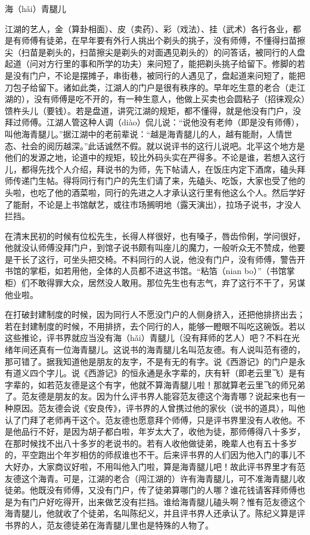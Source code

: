 \documentclass[12pt,UTF8]{ctexbook}
\begin{document}
海（hǎi）青腿儿


江湖的艺人，金（算卦相面）、皮（卖药）、彩（戏法）、挂（武术）各行各业，都是有师傅有徒弟，在早年要有外行人挑出个剃头的挑子，没有师傅，不懂得扫苗擦尖（扫苗是剃头的，扫苗擦尖是剃头的对面遇见剃头的）的问答话，被同行的人盘起道（问对方行里的事和所学的功夫）来问短了，能把剃头挑子给留下。修脚的若是没有门户，不论是摆摊子，串街巷，被同行的人遇见了，盘起道来问短了，能把刀包子给留下。诸如此类，江湖人的门户是很有秩序的。早年吃生意的老合（走江湖的），没有师傅是吃不开的，有一种生意人，他做上买卖也会圆粘子（招徕观众）馈杵头儿（要钱）。若是盘道，讲究江湖的规矩，都不懂得，就是他没有门户，没拜过师傅。江湖人管这种人调（diào）侃儿说：“说他没有老帅（即是没有师傅），叫他海青腿儿。”据江湖中的老前辈说：“越是海青腿儿的人，越有能耐，人情世态、社会的阅历越深。”此话诚然不假。就以说评书的这行儿说吧。北平这个地方是他们的发源之地，论道中的规矩，较比外码头实在严得多。不论是谁，若想入这行儿，都得先找个人介绍，拜说书的为师，先下帖请人，在饭庄内定下酒席，磕头拜师传递门生帖。得将同行有门户的先生们请了来，先磕头、吃饭，大家也受了他的头啦，也吃了他的酒菜啦，同行的先进之人才承认这行里有他这么个人。然后学好了能耐，不论是上书馆献艺，或往市场搁明地（露天演出），拉场子说书，才没人拦挡。

在清末民初的时候有位松先生，长得人样很好，也有嗓子，唇齿伶俐，学问很好，他就没认师傅没拜门户，到馆子说书颇有叫座儿的魔力，一般听众无不赞成，他要是干长了这行，可坐头把交椅。不料同行的人说，他没有门户，没有师傅，警告开书馆的掌柜，如若用他，全体的人员都不进这书馆。“粘箔（nian bo）”（书馆掌柜）们不敢得罪大众，居然没人敢用。那位先生也有志气，弃了这行不干了，另谋他业啦。

在打破封建制度的时候，因为同行人不愿没门户的人侧身挤入，还把他排挤出去；若在封建制度的时候，不用排挤，去个同行的人，能够一瞪眼不叫吃这碗饭。若以这些推论，评书界就应当没有海（hǎi）青腿儿（没有拜师的艺人）吧？不料在光绪年间还真有一位海青腿儿。这说书的海青腿儿名叫范友德。有人说叫范有德的，那可错了。据我知道他是朋友的友字，不是有无的有字。说《西游记》的门户是永有道义四个字儿。说《西游记》的恒永通是永字辈的，庆有轩（即老云里飞）是有字辈的，如若范友德是这个有字，他就不算海青腿儿啦！那就算老云里飞的师兄弟了。范友德是朋友的友。因为什么评书界人能容范友德这个海青哪？说起来也有一种原因。范友德会说《安良传》，评书界的人曾携过他的家伙（说书的道具），叫他认了门拜了老师再干这个。范友德也愿意拜个师傅，只是评书界里没有人收他。不是他品行不好，是因为胡子都白啦，年岁太大了，收他为徒，那师傅得八十多岁，在那时候找不出八十多岁的老说书的。若有人收他做徒弟，晚辈人也有五十多岁的，平空跑出个年岁相仿的师叔谁也不干。后来评书界的人们因为他入门的事儿不大好办，大家商议好啦，不用叫他入门啦，算是海青腿儿吧！故此评书界里才有范友德这个海青。可是，江湖的老合（闯江湖的）许有海青腿儿，可不准海青腿儿收徒弟。他既没有师傅，又没有门户，传了徒弟算哪门的人哪？谁花钱请客拜师傅也是为有门户好吃得开，出来做艺没有拦挡。谁给海青腿儿磕头啊？惟有范友德这个海青腿儿，他就收了个徒弟，名叫陈纪义，并且评书界人还承认了。陈纪义算是评书界的人，范友德徒弟在海青腿儿里也是特殊的人物了。
\end{document}
